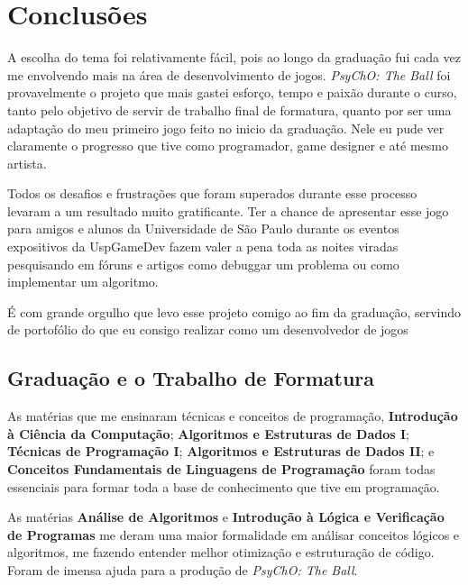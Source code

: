 \chapter{Conclusões}
\label{cap:conclusoes}

A escolha do tema foi relativamente fácil, pois ao longo da graduação fui cada vez me envolvendo mais na área de desenvolvimento de jogos. \textit{PsyChO: The Ball} foi provavelmente o projeto que mais gastei esforço, tempo e paixão durante o curso, tanto pelo objetivo de servir de trabalho final de formatura, quanto por ser uma adaptação do meu primeiro jogo feito no inicio da graduação. Nele eu pude ver claramente o progresso que tive como programador, game designer e até mesmo artista.

Todos os desafios e frustrações que foram superados durante esse processo levaram a um resultado muito gratificante. Ter a chance de apresentar esse jogo para amigos e alunos da Universidade de São Paulo durante os eventos expositivos da UspGameDev fazem valer a pena toda as noites viradas pesquisando em fóruns e artigos como debuggar um problema ou como implementar um algoritmo.

É com grande orgulho que levo esse projeto comigo ao fim da graduação, servindo de portofólio do que eu consigo realizar como um desenvolvedor de jogos

\section{Graduação e o Trabalho de Formatura}
\label{sec:materias_utilizadas}

As matérias que me ensinaram técnicas e conceitos de programação, \textbf{Introdução à Ciência da Computação}; \textbf{Algoritmos e Estruturas de Dados I}; \textbf{Técnicas de Programação I}; \textbf{Algoritmos e Estruturas de Dados II}; e \textbf{Conceitos Fundamentais de Linguagens de Programação} foram todas essenciais para formar toda a base de conhecimento que tive em programação.

As matérias \textbf{Análise de Algoritmos} e \textbf{Introdução à Lógica e Verificação de Programas} me deram uma maior formalidade em análisar conceitos lógicos e algoritmos, me fazendo entender melhor otimização e estruturação de código. Foram de imensa ajuda para a produção de \textit{PsyChO: The Ball}.

